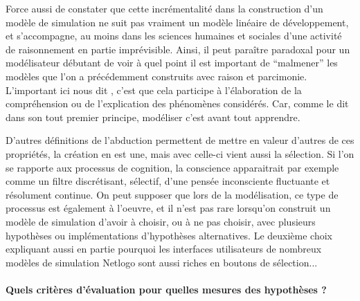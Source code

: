 Force aussi de constater que cette incrémentalité dans la construction d'un modèle de simulation ne suit pas vraiment un modèle linéaire de développement, et s'accompagne, au moins dans les sciences humaines et sociales d'une activité de raisonnement en partie imprévisible. Ainsi, il peut paraître paradoxal pour un modélisateur débutant de voir à quel point il est important de \enquote{malmener} les modèles que l'on a précédemment construits avec raison et parcimonie. L'important ici nous dit \textcite{Amblard2010}, c'est que cela participe à l'élaboration de la compréhension ou de l'explication des phénomènes considérés. Car, comme le dit \textcite[65]{Banos2013} dans son tout premier principe, modéliser c'est avant tout apprendre.

D'autres définitions de l'abduction  permettent de mettre en valeur d'autres de ces propriétés, la création en est une, mais avec celle-ci vient aussi la sélection. Si l'on se rapporte aux processus de cognition, la conscience apparaitrait par exemple comme un filtre discrétisant, sélectif, d'une pensée inconsciente fluctuante et résolument continue. On peut supposer que lors de la modélisation, ce type de processus est également à l'oeuvre, et il n'est pas rare lorsqu'on construit un modèle de simulation d'avoir à choisir, ou à ne pas choisir, avec plusieurs hypothèses ou implémentations d'hypothèses alternatives. Le deuxième choix expliquant aussi en partie pourquoi les interfaces utilisateurs de nombreux modèles de simulation Netlogo sont aussi riches en boutons de sélection...





\paragraph{Quels critères d'évaluation pour quelles mesures des hypothèses ?}
\label{p:critere_evaluation}



